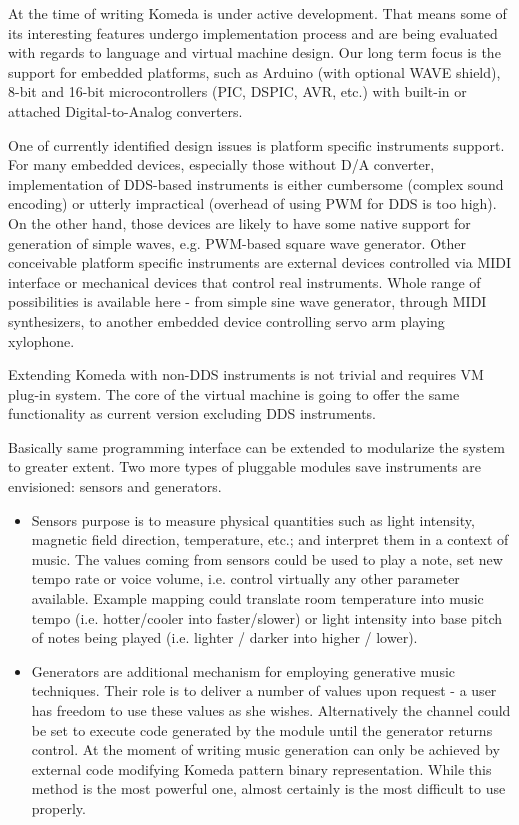\documentclass{article}
\begin{document}
At the time of writing Komeda is under active development. That means some of
its interesting features undergo implementation process and are being evaluated
with regards to language and virtual machine design. Our long term focus is the
support for embedded platforms, such as Arduino (with optional WAVE shield),
8-bit and 16-bit microcontrollers (PIC, DSPIC, AVR, etc.) with built-in or
attached Digital-to-Analog converters.

One of currently identified design issues is platform specific instruments
support. For many embedded devices, especially those without D/A converter,
implementation of DDS-based instruments is either cumbersome (complex sound encoding)
or utterly impractical (overhead of using PWM for DDS is too high). On the other hand,
those devices are likely to have some native support for generation of simple
waves, e.g. PWM-based square wave generator. Other conceivable platform
specific instruments are external devices controlled via MIDI interface or
mechanical devices that control real instruments. Whole range of possibilities
is available here - from simple sine wave generator, through MIDI synthesizers,
to another embedded device controlling servo arm playing xylophone.

Extending Komeda with non-DDS instruments is not trivial and requires VM
plug-in system. The core of the virtual machine is going to offer the same
functionality as current version excluding DDS instruments. 

Basically same programming interface can be extended to modularize the system
to greater extent.  Two more types of pluggable modules save instruments are
envisioned: sensors and generators.

\begin{itemize}
  \item Sensors purpose is to measure physical quantities such as light
    intensity, magnetic field direction, temperature, etc.; and interpret them
    in a context of music. The values coming from sensors could be used to play
    a note, set new tempo rate or voice volume, i.e. control virtually any
    other parameter available. Example mapping could translate room temperature
    into music tempo (i.e. hotter/cooler into faster/slower) or light intensity
    into base pitch of notes being played (i.e. lighter / darker into higher /
    lower).

  \item Generators are additional mechanism for employing generative music
    techniques. Their role is to deliver a number of values upon request - a
    user has freedom to use these values as she wishes. Alternatively the
    channel could be set to execute code generated by the module until the
    generator returns control. At the moment of writing music generation can
    only be achieved by external code modifying Komeda pattern binary
    representation. While this method is the most powerful one, almost
    certainly is the most difficult to use properly. 
\end{itemize}
\end{document}

